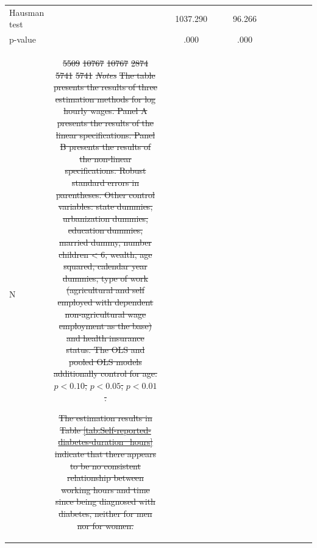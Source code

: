 \documentclass[12pt,english]{article}
\providecommand{\DIFdeltex}[1]{{\protect\color{red}\sout{#1}}}                      %
\providecommand{\DIFdelFL}[1]{\DIFdel{#1}} %
\providecommand{\DIFaddendFL}{} %
\providecommand{\DIFdelbeginFL}{} %
\providecommand{\DIFdel}[1]{\texorpdfstring{\DIFdeltex{#1}}{}} %
\begin{document}
\begin{table}[!ht]
\begin{center}
\begin{adjustbox}{max width=0.8\linewidth}
\begin{threeparttable}
{\begin{tabular}{l*{6}{S
S}}
\DIFaddendFL Hausman test    &                  &                  & 1037.290         &                  &                  &   96.266         \\
\hspace*{10mm} p-value         &                  &                  &     .000         &                  &                  &     .000         \\
N               &     \DIFdelbeginFL \DIFdelFL{5509         }%
\DIFdelFL{10767         }%
\DIFdelFL{10767         }%
\DIFdelFL{2874         }%
\DIFdelFL{5741         }%
\DIFdelFL{5741         }%
\textit{\DIFdelFL{Notes}} %
\DIFdelFL{The table presents the results of three estimation methods for log hourly wages. Panel A presents the results of the linear specifications. Panel B presents the results of the non-linear specifications. Robust standard errors in parentheses. Other control variables: state dummies, urbanization dummies, education dummies, married dummy, number children < 6, wealth, age squared, calendar year dummies, type of work (agricultural and self employed with dependent non-agricultural wage employment as the base) and health insurance status. The OLS and pooled OLS models additionally control for age. }%
\DIFdelFL{\(p<0.10\), }%
\DIFdelFL{\(p<0.05\), }%
\DIFdelFL{\(p<0.01\).
}%

\DIFdelFL{The estimation results in Table \ref{tab:Self-reported-diabetes-duration_hours} indicate that there appears to be no consistent relationship between working hours and time since being diagnosed with diabetes, neither for men nor for women.
}%


\end{tabular}}
\end{threeparttable}
\end{adjustbox}
\end{center}
\end{table}
\end{document}
